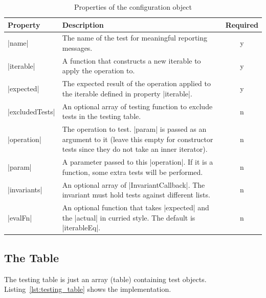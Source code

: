 \begin{table}[H]
  \center
  \begin{tabular}{ l m{10cm} c}
    \textbf{Property} & \textbf{Description} & \textbf{Required}\\
    \hline
    |name|            & The name of the test for meaningful 
                      reporting messages. 
                    & y 
                    \\ 
    |iterable|        & A function that constructs a new iterable to apply the 
                      operation to. 
                    & y 
                    \\  
    |expected|        & The expected result of the operation applied to the iterable
                      defined in property |iterable|.
                    & 
                    y  \\ 
    |excludedTests|   & An optional array of testing function to exclude tests
                      in the testing table. 
                    & n 
                    \\
    |operation|       & The operation to test. |param| is passed as an argument
                      to it
                     (leave this empty for constructor 
                      tests since they do not take an inner iterator). 
                    & n 
                    \\
    |param|           & A parameter passed to this |operation|. If it is a
                      function, some extra tests will be performed. 
                    & n
                    \\ 
    |invariants|      & An optional array of |InvariantCallback|. The invariant 
                      must hold tests against different lists. 
                    & n
                    \\
    |evalFn|          & An optional function that takes |expected| and the |actual| 
                      in curried style. The default is |iterableEq|.
                    & n 
                    \\
  \end{tabular}
  \caption{Properties of the configuration object}
\label{tab:testing_table}
\end{table}

\subsection{The Table}
\label{sub:The Table}
The testing table is just an array (table) containing test objects.
Listing~\ref{lst:testing_table} shows the implementation.

